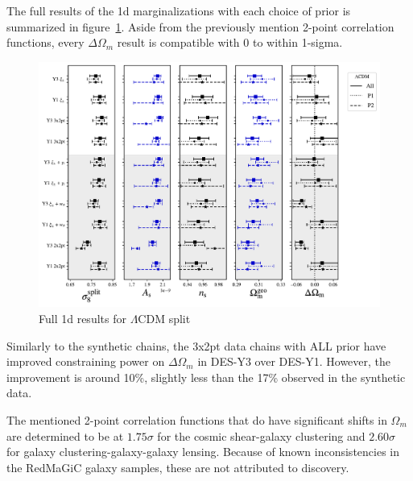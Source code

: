 The full results of the 1d marginalizations with each choice of prior is summarized in figure~\ref{fig:lcdm_result_1d}. Aside from the previously mention 2-point correlation functions, every $\Delta\Omega_m$ result is compatible with 0 to within 1-sigma.
\begin{figure}[ht]
	\centering
	\includegraphics[width=\textwidth]{plots/plot_1d_resultv5.pdf}
	\caption{Full 1d results for $\Lambda$CDM split}
	\label{fig:lcdm_result_1d}
\end{figure}
Similarly to the synthetic chains, the 3x2pt data chains with ALL prior have improved constraining power on $\Delta\Omega_m$ in DES-Y3 over DES-Y1. However, the improvement is around 10\%, slightly less than the 17\% observed in the synthetic data. 

The mentioned 2-point correlation functions that do have significant shifts in $\Omega_m$ are determined to be at $1.75\sigma$ for the cosmic shear-galaxy clustering and $2.60\sigma$ for galaxy clustering-galaxy-galaxy lensing. Because of known inconsistencies in the RedMaGiC galaxy samples, these are not attributed to discovery.
